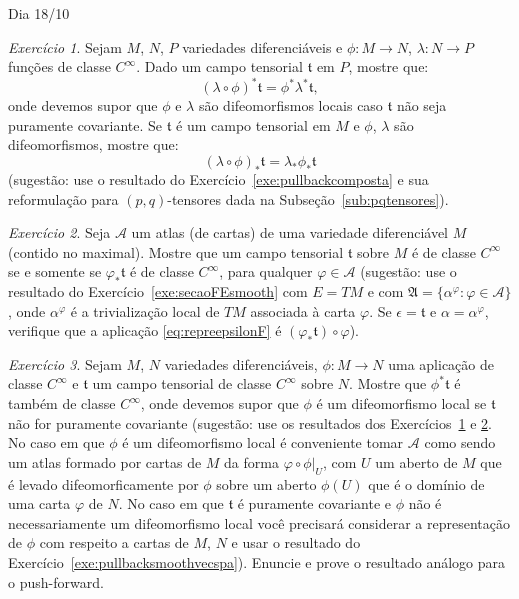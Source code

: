 \documentclass[oneside,11pt]{amsart}
\theoremstyle{remark}\newtheorem{exercise}{Exercício}[section]
\theoremstyle{plain}\newtheorem{teo}{Teorema}[section]
\theoremstyle{plain}\newtheorem{lem}[teo]{Lema}
\theoremstyle{plain}\newtheorem{prop}[teo]{Proposição}
\theoremstyle{definition}\newtheorem{defin}[teo]{Definição}
\theoremstyle{remark}\newtheorem{rem}[teo]{Observação}
\theoremstyle{definition}\newtheorem{example}[teo]{Exemplo}
\numberwithin{equation}{section}
\begin{document}
\begin{section}{Dia 18/10}
\begin{exercise}\label{exe:pullbackcompostafield}
Sejam $M$, $N$, $P$ variedades diferenciáveis e $\phi:M\to N$, $\lambda:N\to P$ funções de classe $C^\infty$. Dado um campo tensorial $\mathfrak t$
em $P$, mostre que:
\[(\lambda\circ\phi)^*\mathfrak t=\phi^*\lambda^*\mathfrak t,\]
onde devemos supor que $\phi$ e $\lambda$ são difeomorfismos locais caso $\mathfrak t$ não seja puramente covariante. Se $\mathfrak t$ é um campo
tensorial em $M$ e $\phi$, $\lambda$ são difeomorfismos, mostre que:
\[(\lambda\circ\phi)_*\mathfrak t=\lambda_*\phi_*\mathfrak t\]
(sugestão: use o resultado do Exercício~\ref{exe:pullbackcomposta} e sua reformulação para $(p,q)$-tensores dada na Subseção~\ref{sub:pqtensores}).
\end{exercise}

\begin{exercise}\label{exe:crittensorsmooth}
Seja $\mathcal A$ um atlas (de cartas) de uma variedade diferenciável $M$ (contido no maximal). Mostre que um campo tensorial $\mathfrak t$ sobre $M$ é
de classe $C^\infty$ se e somente se $\varphi_*\mathfrak t$ é de classe $C^\infty$, para qualquer $\varphi\in\mathcal A$ (sugestão: use o resultado
do Exercício~\ref{exe:secaoFEsmooth} com $E=TM$ e com $\mathfrak A=\big\{\alpha^\varphi:\varphi\in\mathcal A\big\}$, onde $\alpha^\varphi$ é a trivialização
local de $TM$ associada à carta $\varphi$. Se $\epsilon=\mathfrak t$ e $\alpha=\alpha^\varphi$, verifique que a aplicação \eqref{eq:repreepsilonF} é
$(\varphi_*\mathfrak t)\circ\varphi$).
\end{exercise}

\begin{exercise}\label{exe:pullbacksmoothmanifold}
Sejam $M$, $N$ variedades diferenciáveis, $\phi:M\to N$ uma aplicação de classe $C^\infty$ e $\mathfrak t$ um campo tensorial de classe $C^\infty$ sobre $N$.
Mostre que $\phi^*\mathfrak t$ é também de classe $C^\infty$, onde devemos supor que $\phi$ é um difeomorfismo local se $\mathfrak t$ não for puramente covariante
(sugestão: use os resultados dos Exercícios~\ref{exe:pullbackcompostafield} e \ref{exe:crittensorsmooth}. No caso em que $\phi$ é um difeomorfismo local
é conveniente tomar $\mathcal A$ como sendo um atlas formado por cartas de $M$ da forma $\varphi\circ\phi\vert_U$, com $U$ um aberto de $M$ que é levado
difeomorficamente por $\phi$ sobre um aberto $\phi(U)$ que é o domínio de uma carta $\varphi$ de $N$.
No caso em que $\mathfrak t$ é puramente covariante e $\phi$ não é necessariamente um difeomorfismo
local você precisará considerar a representação de $\phi$ com respeito a cartas de $M$, $N$ e usar o resultado do Exercício~\ref{exe:pullbacksmoothvecspa}).
Enuncie e prove o resultado análogo para o push-forward.
\end{exercise}


\end{section}
\end{document}
